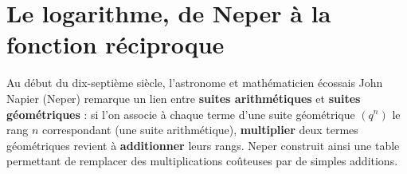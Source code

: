 
\section{Le logarithme, de Neper à la fonction réciproque}


Au début du dix-septième siècle, l'astronome et mathématicien écossais John Napier (Neper) remarque un lien entre \textbf{suites arithmétiques} et \textbf{suites géométriques} : si l'on associe à chaque terme d'une suite géométrique $(q^n)$ le rang $n$ correspondant (une suite arithmétique), \textbf{multiplier} deux termes géométriques revient à \textbf{additionner} leurs rangs. Neper construit ainsi une table permettant de remplacer des multiplications coûteuses par de simples additions.






